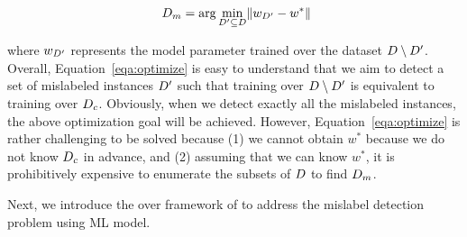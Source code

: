 \begin{equation}~\label{eqa:optimize}
D_m = \arg\min\limits_{D'\subseteq D} \rVert w_{D'}-w^* \lVert
\end{equation}

\noindent where $w_{D'}$ represents the model parameter trained over the dataset $D \setminus D'$. Overall, Equation~\ref{eqa:optimize}
is easy to understand that we aim to detect a set of mislabeled instances $D'$ such that training over $D \setminus D'$ is equivalent to training over $D_c$. Obviously, when we detect exactly all the mislabeled instances, the above optimization goal will be achieved. However, Equation~\ref{eqa:optimize} is rather challenging to be solved because (1) we cannot obtain $w^*$ because we do not know $D_c$ in advance, and (2) assuming that we can know  $w^*$, it is prohibitively expensive to enumerate the subsets of $D$ to find $D_m$.

Next, we introduce the over framework of \sys to address the mislabel detection problem using ML model.




